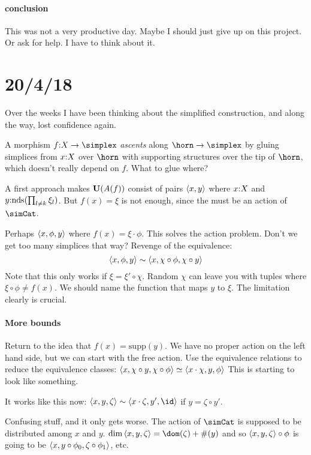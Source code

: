 \documentclass[csh.tex]{subfiles}
\begin{document}
\paragraph{conclusion}
This was not a very productive day. Maybe I should just give up on this project. Or ask for help. I have to think about it.

\section{20/4/18}
Over the weeks I have been thinking about the simplified construction,
and along the way, lost confidence again.

A morphism $f\of X\to \simplex$ \emph{ascents} along $\horn\to\simplex$ by gluing simplices from $x\mathord : X$ over $\horn$ with supporting structures over the tip of $\horn$, which doesn't really depend on $f$. What to glue where?

A first approach makes $\mathbf{U}(A(f))$ consist of pairs $\left\langle x,y \right\rangle$ where $x\mathord : X$ and $y\mathord :\mathrm{nds}(\prod_{l\neq k}\xi_l)$. But $f(x) = \xi$ is not enough, since the must be an action of $\simCat$.

Perhaps $\left\langle x,\phi,y \right\rangle$ where $f(x) = \xi\cdot \phi$. This solves the action problem. Don't we get too many simplices that way?
Revenge of the equivalence:
\[ \left\langle x,\phi,y \right\rangle\sim \left\langle x,\chi\circ\phi,\chi\circ y \right\rangle \]
Note that this only works if $\xi = \xi'\circ \chi$. Random $\chi$ can leave you with tuples where $\xi\circ \phi\neq f(x)$. We should name the function that maps $y$ to $\xi$. The limitation clearly is crucial.

\paragraph{More bounds}
Return to the idea that $f(x) = \mathrm{supp}(y)$. We have no proper action on the left hand side, but we can start with the free action. Use the equivalence relations to reduce the equivalence classes:
$\left\langle x,\chi \circ y,\chi\circ\phi \right\rangle\simeq \left\langle x\cdot \chi,y,\phi \right\rangle$
This is starting to look like something.

It works like this now: $\tuplet{x,y,\zeta}\sim \tuplet{x\cdot\zeta,y',\id}$ if $y = \zeta\circ y'$.

Confusing stuff, and it only gets worse. The action of $\simCat$ is supposed to be distributed among $x$ and $y$. $\dim\tuplet{x,y,\zeta} = \dom(\zeta) + \#(y)$ and so $\left\langle x,y,\zeta \right\rangle\circ\phi$ is going to be $\left\langle x,y\circ \phi_0,\zeta\circ\phi_1 \right\rangle$, etc.
\end{document}
